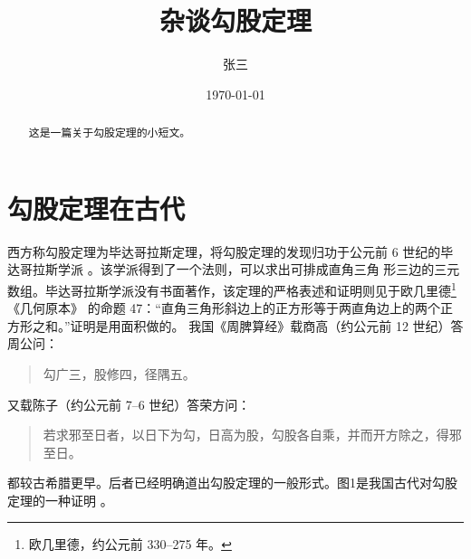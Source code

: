\documentclass[UTF8] {ctexart}
\title{杂谈勾股定理}
\author{张三}
\date{\today}
\begin{document}
\maketitle  %

\begin{abstract}
这是一篇关于勾股定理的小短文。 %
\end{abstract}

\tableofcontents    %

\section{勾股定理在古代}   %
\label{sec:ancient}     %
西方称勾股定理为毕达哥拉斯定理，将勾股定理的发现归功于公元前 6 世纪的毕达哥拉斯学派 \cite{Kline}。该学派得到了一个法则，可以求出可排成直角三角
形三边的三元数组。毕达哥拉斯学派没有书面著作，该定理的严格表述和证明则见于欧几里德\footnote{欧几里德，约公元前 330--275 年。}《几何原本》
的命题 47：“直角三角形斜边上的正方形等于两直角边上的两个正方形之和。”证明是用面积做的。   %
我国《周脾算经》载商高（约公元前 12 世纪）答周公问：
\begin{quote}   %
\kaishu 勾广三，股修四，径隅五。  %
\end{quote}
又载陈子（约公元前 7--6 世纪）答荣方问：
\begin{quote}
\kaishu 若求邪至日者，以日下为勾，日高为股，勾股各自乘，并而开方除之，得邪至日。
\end{quote}
都较古希腊更早。后者已经明确道出勾股定理的一般形式。图1是我国古代对勾股定理的一种证明 \cite{quanjing}。    %
\end{document}
